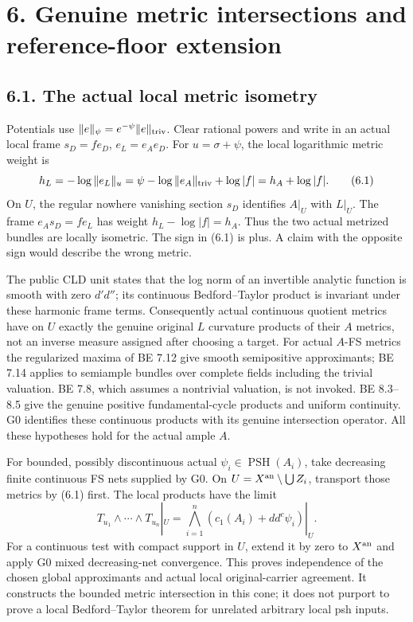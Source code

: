 \documentclass[
  10pt,
]{article}
\begin{document}
\section{6. Genuine metric intersections and reference-floor
extension}\label{genuine-metric-intersections-and-reference-floor-extension}

\subsection{6.1. The actual local metric
isometry}\label{the-actual-local-metric-isometry}

Potentials use \(\|e\|_\psi=e^{-\psi}\|e\|_{\rm triv}\). Clear rational
powers and write in an actual local frame \(s_D=f e_D\), \(e_L=e_Ae_D\).
For \(u=\sigma+\psi\), the local logarithmic metric weight is
\[h_L=-\log\|e_L\|_u
 =\psi-\log\|e_A\|_{\rm triv}+\log|f|
 =h_A+\log|f|.\tag{6.1}\] On \(U\), the regular nowhere vanishing
section \(s_D\) identifies \(A|_U\) with \(L|_U\). The frame
\(e_As_D=f e_L\) has weight \(h_L-\log|f|=h_A\). Thus the two actual
metrized bundles are locally isometric. The sign in (6.1) is plus. A
claim with the opposite sign would describe the wrong metric.

The public CLD unit states that the log norm of an invertible analytic
function is smooth with zero \(d'd''\); its continuous Bedford--Taylor
product is invariant under these harmonic frame terms. Consequently
actual continuous quotient metrics have on \(U\) exactly the genuine
original \(L\) curvature products of their \(A\) metrics, not an inverse
measure assigned after choosing a target. For actual \(A\)-FS metrics
the regularized maxima of BE 7.12 give smooth semipositive approximants;
BE 7.14 applies to semiample bundles over complete fields including the
trivial valuation. BE 7.8, which assumes a nontrivial valuation, is not
invoked. BE 8.3--8.5 give the genuine positive fundamental-cycle
products and uniform continuity. G0 identifies these continuous products
with its genuine intersection operator. All these hypotheses hold for
the actual ample \(A\).

For bounded, possibly discontinuous actual
\(\psi_i\in\operatorname{PSH}(A_i)\), take decreasing finite continuous
FS nets supplied by G0. On \(U=X^{\rm an}\setminus\bigcup Z_i\),
transport those metrics by (6.1) first. The local products have the
limit \[T_{u_1}\wedge\cdots\wedge T_{u_n}|_U
 =\bigwedge_{i=1}^n(c_1(A_i)+dd^c\psi_i)|_U.\tag{6.2}\] For a continuous
test with compact support in \(U\), extend it by zero to \(X^{\rm an}\)
and apply G0 mixed decreasing-net convergence. This proves independence
of the chosen global approximants and actual local original-carrier
agreement. It constructs the bounded metric intersection in this cone;
it does not purport to prove a local Bedford--Taylor theorem for
unrelated arbitrary local psh inputs.
\end{document}
